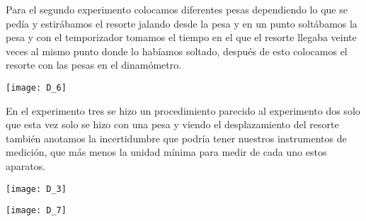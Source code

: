 \documentclass[11pt,a4paper]{article}
\newenvironment{Figuras}
  {\par\medskip\noindent\minipage{\linewidth}}
  {\endminipage\par\medskip}
\begin{document}
\begin{multicols}{2}
Para el segundo experimento colocamos diferentes pesas dependiendo lo que se pedía y estirábamos el resorte jalando desde la pesa y en un punto soltábamos la pesa y con el temporizador tomamos el tiempo en el que el resorte llegaba veinte veces al mismo punto donde lo habíamos soltado, después de esto colocamos el resorte con las pesas en el dinamómetro.\\

\begin{Figuras}
	\centering
    \texttt{[image: D\_6]}
    \label{fig:mesh8}
\end{Figuras}

En el experimento tres se hizo un procedimiento parecido al experimento dos solo que esta vez solo se hizo con una pesa y viendo el desplazamiento del resorte también anotamos la incertidumbre  que podría tener nuestros instrumentos de medición, que más menos la unidad mínima para medir de cada uno estos aparatos.\\

\begin{Figuras}
	\centering
    \texttt{[image: D\_3]}
    \label{fig:mesh89}
\end{Figuras}

\begin{Figuras}
	\centering
    \texttt{[image: D\_7]}
    \label{fig:mesh9}
\end{Figuras}




\end{multicols}
\end{document}
